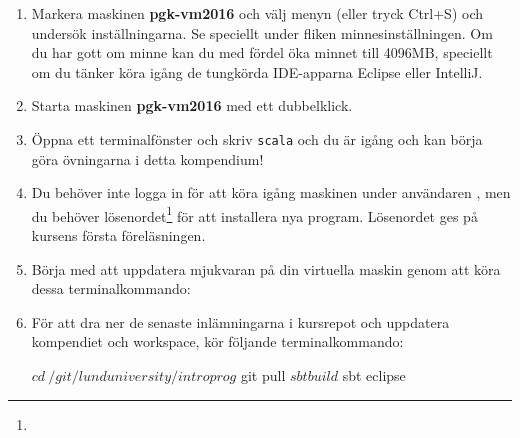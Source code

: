 \begin{enumerate}
\item Markera maskinen \textbf{pgk-vm2016} och välj menyn  (eller tryck Ctrl+S) och undersök inställningarna. Se speciellt under fliken  minnesinställningen. Om du har gott om minne kan du med fördel öka minnet till 4096MB, speciellt om du tänker köra igång de tungkörda IDE-apparna Eclipse eller IntelliJ.

\item     Starta maskinen \textbf{pgk-vm2016} med ett dubbelklick.

\item     Öppna ett terminalfönster och skriv \texttt{scala} och du är igång och kan börja göra övningarna i detta kompendium!

\item Du behöver inte logga in för att köra igång maskinen under användaren , men du  behöver lösenordet\footnote{} för att installera nya program. Lösenordet ges på kursens första föreläsningen.

\item Börja med att uppdatera mjukvaran på din virtuella maskin genom att köra dessa terminalkommando:


\item För att dra ner de senaste inlämningarna i kursrepot och uppdatera kompendiet och workspace, kör följande terminalkommando:
\begin{REPLnonum}
$ cd ~/git/lunduniversity/introprog
$ git pull
$ sbt build
$ sbt eclipse
\end{REPLnonum}

\end{enumerate}


